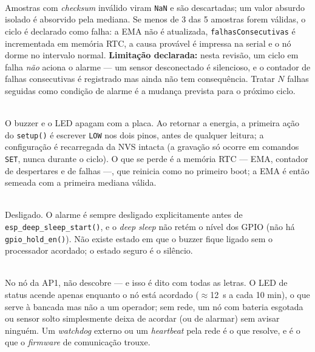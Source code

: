 \begin{description}[style=unboxed, leftmargin=0pt, font=\normalfont\bfseries]
  \item[Se o sensor devolver lixo.]\hfill\\
    Amostras com \emph{checksum} inválido viram \texttt{NaN} e são
    descartadas; um valor absurdo isolado é absorvido pela mediana. Se
    menos de 3 das 5 amostras forem válidas, o ciclo é declarado como
    falha: a EMA não é atualizada, \texttt{falhasConsecutivas} é
    incrementada em memória RTC, a causa provável é impressa na
    serial e o nó dorme no intervalo normal. \textbf{Limitação
    declarada:} nesta revisão, um ciclo em falha \emph{não} aciona o
    alarme --- um sensor desconectado é silencioso, e o contador de
    falhas consecutivas é registrado mas ainda não tem consequência.
    Tratar $N$ falhas seguidas como condição de alarme é a mudança
    prevista para o próximo ciclo.
  \item[Se a alimentação cair no meio de um acionamento.]\hfill\\
    O buzzer e o LED apagam com a placa. Ao retornar a energia, a
    primeira ação do \texttt{setup()} é escrever \texttt{LOW} nos dois
    pinos, antes de qualquer leitura; a configuração é recarregada da
    NVS intacta (a gravação só ocorre em comandos \texttt{SET}, nunca
    durante o ciclo). O que se perde é a memória RTC --- EMA, contador
    de despertares e de falhas ---, que reinicia como no primeiro
    boot; a EMA é então semeada com a primeira mediana válida.
  \item[Em que posição o atuador fica quando o nó desliga ou dorme.]\hfill\\
    Desligado. O alarme é sempre desligado explicitamente antes de
    \texttt{esp\_deep\_sleep\_start()}, e o \emph{deep sleep} não
    retém o nível dos GPIO (não há \texttt{gpio\_hold\_en()}). Não
    existe estado em que o buzzer fique ligado sem o processador
    acordado; o estado seguro é o silêncio.
  \item[Como alguém descobre que o sistema parou.]\hfill\\
    No nó da AP1, não descobre --- e isso é dito com todas as letras.
    O LED de status acende apenas enquanto o nó está acordado
    ($\approx$\SI{12}{\second} a cada 10 min), o que serve à bancada
    mas não a um operador; sem rede, um nó com bateria esgotada ou
    sensor solto simplesmente deixa de acordar (ou de alarmar) sem
    avisar ninguém. Um \emph{watchdog} externo ou um
    \emph{heartbeat} pela rede é o que resolve, e é o que o
    \emph{firmware} de comunicação trouxe.


\end{description}
